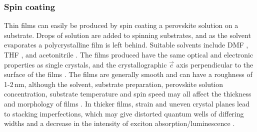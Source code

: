 \subsubsection{Spin coating}
Thin films can easily be produced by spin coating a perovskite solution on a substrate. Drops of solution are added to spinning substrates, and as the solvent evaporates a polycrystalline film is left behind. Suitable solvents include DMF \cite{Kikuchi2005}, THF \cite{Kataoka1994}, and acetonitrile \cite{VijayaPrakash2009}. The films produced have the same optical and electronic properties as single crystals, and the crystallographic $\vec{c}$ axis perpendicular to the surface of the films \cite{Kataoka1993}. The films are generally smooth and can have a roughness of 1-2\,nm, although the solvent, substrate preparation, perovskite solution concentration, substrate temperature and spin speed may all affect the thickness and morphology of films \cite{Mitzi2001b}. In thicker films, strain and uneven crystal planes lead to stacking imperfections, which may give distorted quantum wells of differing widths and a decrease in the intensity of exciton absorption/luminescence \cite{VijayaPrakash2009}.

